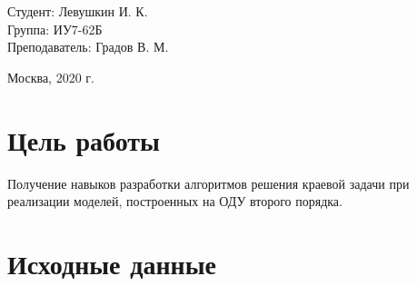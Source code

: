 \documentclass[a4paper,12pt]{article}
\begin{document}
	\large
	\begin{flushright}
		Студент: Левушкин И. К. \\
		Группа: ИУ7-62Б \\
		Преподаватель: Градов В. М. \\
	\end{flushright}
	
	\vspace*{30mm}
	\begin{center}
		Москва, 2020 г.  
	\end{center}
	\thispagestyle{empty}
	
	
	\newpage
	
	\section*{Цель работы}
	
	Получение навыков разработки алгоритмов решения краевой задачи при реализации моделей, построенных на ОДУ второго порядка.
	
	\section*{Исходные данные}
	
\end{document}
